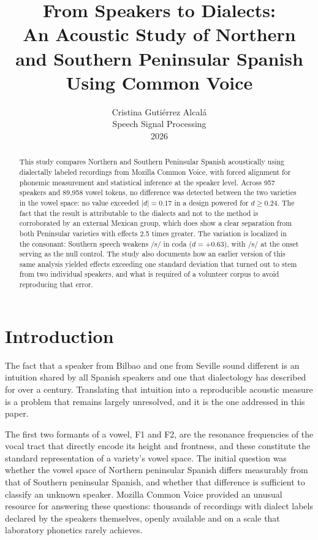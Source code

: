 \documentclass[11pt]{article}
\title{From Speakers to Dialects:\\An Acoustic Study of Northern and Southern
Peninsular Spanish Using Common Voice}
\author{Cristina Guti\'errez Alcal\'a \\
  Speech Signal Processing \\
  2026}
\begin{document}
\maketitle

\begin{abstract}
This study compares Northern and Southern Peninsular Spanish acoustically using
dialectally labeled recordings from Mozilla Common Voice, with forced alignment
for phonemic measurement and statistical inference at the speaker level. Across
957 speakers and 89,958 vowel tokens, no difference was detected between the two
varieties in the vowel space: no value exceeded $|d| = 0.17$ in a design powered
for $d \geq 0.24$. The fact that the result is attributable to the dialects and
not to the method is corroborated by an external Mexican group, which does show a
clear separation from both Peninsular varieties with effects 2.5 times greater.
The variation is localized in the consonant: Southern speech weakens /s/ in coda
($d = +0.63$), with /s/ at the onset serving as the null control. The study also
documents how an earlier version of this same analysis yielded effects exceeding
one standard deviation that turned out to stem from two individual speakers, and
what is required of a volunteer corpus to avoid reproducing that error.
\end{abstract}

\section{Introduction}

The fact that a speaker from Bilbao and one from Seville sound different is an
intuition shared by all Spanish speakers and one that dialectology has described
for over a century. Translating that intuition into a reproducible acoustic
measure is a problem that remains largely unresolved, and it is the one addressed
in this paper.

The first two formants of a vowel, F1 and F2, are the resonance frequencies of
the vocal tract that directly encode its height and frontness, and these
constitute the standard representation of a variety's vowel space. The initial
question was whether the vowel space of Northern peninsular Spanish differs
measurably from that of Southern peninsular Spanish, and whether that difference
is sufficient to classify an unknown speaker. Mozilla Common Voice provided an
unusual resource for answering these questions: thousands of recordings with
dialect labels declared by the speakers themselves, openly available and on a
scale that laboratory phonetics rarely achieves.
\end{document}
